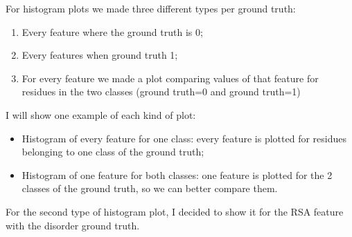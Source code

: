 For histogram plots we made three different types per ground truth:

\begin{enumerate}
    \item Every feature where the ground truth is 0;
    \item Every features when ground truth 1;
    \item For every feature we made a plot comparing values of that feature for residues in the two classes (ground truth=0 and ground truth=1)
\end{enumerate}


I will show one example of each kind of plot: 

\begin{itemize}
    \item Histogram of every feature for one class: every feature is plotted for residues belonging to one class of the ground truth;
    \item Histogram of one feature for both classes: one feature is plotted for the 2 classes of the ground truth, so we can better compare them.
\end{itemize}

For the second type of histogram plot, I decided to show it for the RSA feature with the disorder ground truth.

